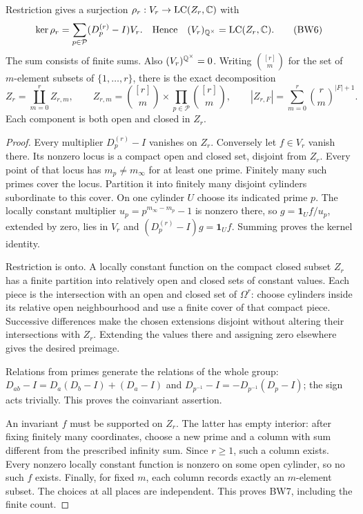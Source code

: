 \begin{theorem}
Restriction gives a surjection $\rho_r:V_r\to\operatorname{LC}(Z_r,\mathbb C)$ with
\[
 \ker\rho_r=\sum_{p\in\mathcal P}(D_p^{(r)}-I)V_r.
 \quad\text{Hence}\quad
 (V_r)_{\mathbb Q^\times}=\operatorname{LC}(Z_r,\mathbb C).
 \tag{BW6}
\]
The sum consists of finite sums. Also $(V_r)^{\mathbb Q^\times}=0$.
Writing $\binom{[r]}m$ for the set of $m$-element subsets of
$\{1,\ldots,r\}$, there is the exact decomposition
\[
 Z_r=\coprod_{m=0}^r Z_{r,m},\qquad
 Z_{r,m}=\binom{[r]}m\times\prod_{p\in\mathcal P}\binom{[r]}m,
 \qquad
 |Z_{r,F}|=\sum_{m=0}^r\binom rm^{|F|+1}.
 \tag{BW7}
\]
Each component is both open and closed in $Z_r$.
\end{theorem}
\begin{proof}
Every multiplier $D_p^{(r)}-I$ vanishes on $Z_r$. Conversely let
$f\in V_r$ vanish there. Its nonzero locus is a compact open and closed
set, disjoint from $Z_r$. Every point of that locus has
$m_p\ne m_\infty$ for at least one prime. Finitely many such primes
cover the locus. Partition it into finitely many disjoint cylinders
subordinate to this cover. On one cylinder $U$ choose its indicated
prime $p$. The locally constant multiplier
$u_p=p^{m_\infty-m_p}-1$ is nonzero there, so
$g=\mathbf1_Uf/u_p$, extended by zero, lies in $V_r$ and
$(D_p^{(r)}-I)g=\mathbf1_Uf$. Summing proves the kernel identity.

Restriction is onto. A locally constant function on the compact closed
subset $Z_r$ has a finite partition into relatively open and closed
sets of constant values. Each piece is the intersection with an open
and closed set of $\Omega^r$: choose cylinders inside its relative
open neighbourhood and use a finite cover of that compact piece.
Successive differences make the chosen extensions disjoint without
altering their intersections with $Z_r$. Extending the values there
and assigning zero elsewhere gives the desired preimage.

Relations from primes generate the relations of the whole group:
$D_{ab}-I=D_a(D_b-I)+(D_a-I)$ and
$D_{p^{-1}}-I=-D_{p^{-1}}(D_p-I)$; the sign acts trivially.
This proves the coinvariant assertion.

An invariant $f$ must be supported on $Z_r$. The latter has empty
interior: after fixing finitely many coordinates, choose a new prime
and a column with sum different from the prescribed infinity sum.
Since $r\ge1$, such a column exists. Every nonzero locally constant
function is nonzero on some open cylinder, so no such $f$ exists.
Finally, for fixed $m$, each column records exactly an $m$-element
subset. The choices at all places are independent. This proves BW7,
including the finite count.
\end{proof}

